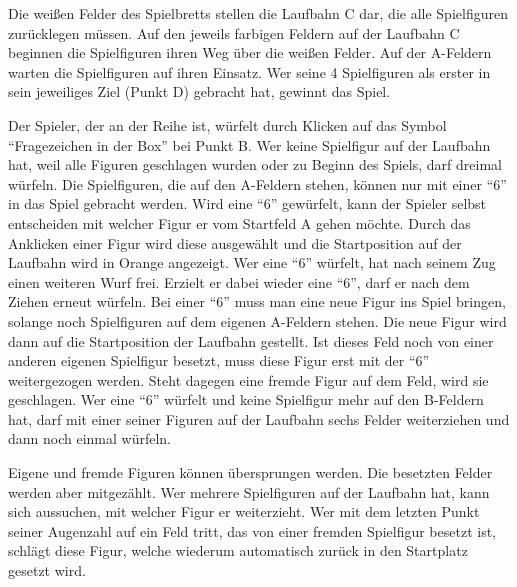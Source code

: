 Die weißen Felder des Spielbretts stellen die Laufbahn C dar, die alle Spielfiguren zurücklegen müssen. Auf den jeweils farbigen Feldern auf der Laufbahn C beginnen die Spielfiguren ihren Weg über die weißen Felder. Auf der A-Feldern warten die Spielfiguren auf ihren Einsatz. Wer seine 4 Spielfiguren als erster in sein jeweiliges Ziel (Punkt D) gebracht hat, gewinnt das Spiel.

\newpage

\noindent Der Spieler, der an der Reihe ist, würfelt durch Klicken auf das Symbol \enquote{Fragezeichen in der Box} bei Punkt B. Wer keine Spielfigur auf der Laufbahn hat, weil alle Figuren geschlagen wurden oder zu Beginn des Spiels, darf dreimal würfeln. Die Spielfiguren, die auf den A-Feldern stehen, können nur mit einer \enquote{6} in das Spiel gebracht werden. Wird eine \enquote{6} gewürfelt, kann der Spieler selbst entscheiden mit welcher Figur er vom Startfeld A gehen möchte. Durch das Anklicken einer Figur wird diese ausgewählt und die Startposition auf der Laufbahn wird in Orange angezeigt. Wer eine \enquote{6} würfelt, hat nach seinem Zug einen weiteren Wurf frei. Erzielt er dabei wieder eine \enquote{6}, darf er nach dem Ziehen erneut würfeln. Bei einer \enquote{6} muss man eine neue Figur ins Spiel bringen, solange noch Spielfiguren auf dem eigenen A-Feldern stehen. Die neue Figur wird dann auf die Startposition der Laufbahn gestellt. Ist dieses Feld noch von einer anderen eigenen Spielfigur besetzt, muss diese Figur erst mit der \enquote{6} weitergezogen werden. Steht dagegen eine fremde Figur auf dem Feld, wird sie geschlagen. Wer eine \enquote{6} würfelt und keine Spielfigur mehr auf den B-Feldern hat, darf mit einer seiner Figuren auf der Laufbahn sechs Felder weiterziehen und dann noch einmal würfeln.

Eigene und fremde Figuren können übersprungen werden. Die besetzten Felder werden aber mitgezählt. Wer mehrere Spielfiguren auf der Laufbahn hat, kann sich aussuchen, mit welcher Figur er weiterzieht. Wer mit dem letzten Punkt seiner Augenzahl auf ein Feld tritt, das von einer fremden Spielfigur besetzt ist, schlägt diese Figur, welche wiederum automatisch zurück in den Startplatz gesetzt wird. 

